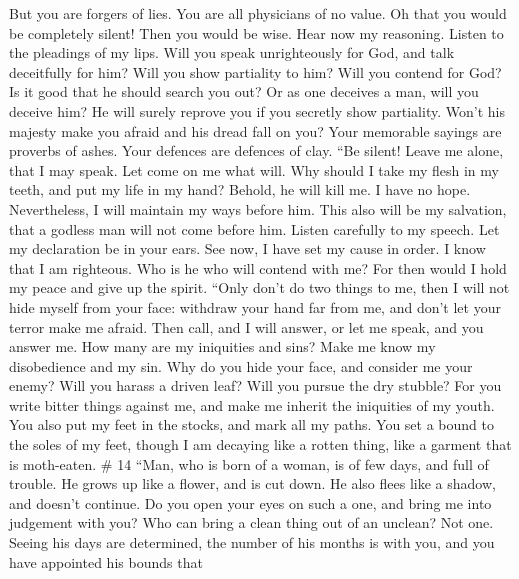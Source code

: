 But you are forgers of lies. You are all physicians of no value.
 Oh that you would be completely silent! Then you would be
wise.  Hear now my reasoning. Listen to the pleadings of my
lips.  Will you speak unrighteously for God, and talk
deceitfully for him?  Will you show partiality to him? Will
you contend for God?  Is it good that he should search you
out? Or as one deceives a man, will you deceive him?  He
will surely reprove you if you secretly show partiality. 
Won't his majesty make you afraid and his dread fall on you?
 Your memorable sayings are proverbs of ashes. Your
defences are defences of clay.  ``Be silent! Leave me
alone, that I may speak. Let come on me what will.  Why
should I take my flesh in my teeth, and put my life in my hand?
 Behold, he will kill me. I have no hope. Nevertheless, I
will maintain my ways before him.  This also will be my
salvation, that a godless man will not come before him. 
Listen carefully to my speech. Let my declaration be in your ears.
 See now, I have set my cause in order. I know that I am
righteous.  Who is he who will contend with me? For then
would I hold my peace and give up the spirit.  ``Only don't
do two things to me, then I will not hide myself from your face:
 withdraw your hand far from me, and don't let your terror
make me afraid.  Then call, and I will answer, or let me
speak, and you answer me.  How many are my iniquities and
sins? Make me know my disobedience and my sin.  Why do you
hide your face, and consider me your enemy?  Will you
harass a driven leaf? Will you pursue the dry stubble?  For
you write bitter things against me, and make me inherit the iniquities
of my youth.  You also put my feet in the stocks, and mark
all my paths. You set a bound to the soles of my feet, 
though I am decaying like a rotten thing, like a garment that is
moth-eaten. \# 14  ``Man, who is born of a woman, is of few
days, and full of trouble.  He grows up like a flower, and
is cut down. He also flees like a shadow, and doesn't continue.
 Do you open your eyes on such a one, and bring me into
judgement with you?  Who can bring a clean thing out of an
unclean? Not one.  Seeing his days are determined, the
number of his months is with you, and you have appointed his bounds that
